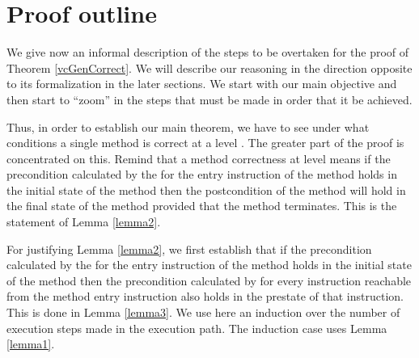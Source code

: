 \section{Proof outline} \label{proof:outline}


We  give now  an informal description of the steps to be overtaken for the proof of Theorem \ref{vcGenCorrect}.
We will describe our reasoning in the direction opposite to its formalization in the later sections.
 We start with our main objective and then start to ``zoom'' in the steps that must be made in order that it be achieved. 


Thus, in order to establish our main theorem,
we have to see under what conditions a single method is correct at a level . The greater 
  part of the proof is concentrated on this. Remind that a method correctness at level   means 
 if the precondition calculated by 
the \fwpi{} for the entry instruction of the method
holds in the initial state of the method
then the postcondition of the method will hold in the final state of the method provided that the method terminates. 
This is the statement of  Lemma \ref{lemma2}. 

 For justifying Lemma \ref{lemma2}, we first establish that if the precondition calculated by
the \fwpi{} for the entry instruction of the method holds in the initial state of the method then the precondition calculated by \fwpi{}
for every instruction reachable from the method entry instruction also holds in the prestate of that instruction. This is done in Lemma \ref{lemma3}. 
We use here an induction over the number of execution steps made in the execution path.
The induction case uses Lemma \ref{lemma1}.

